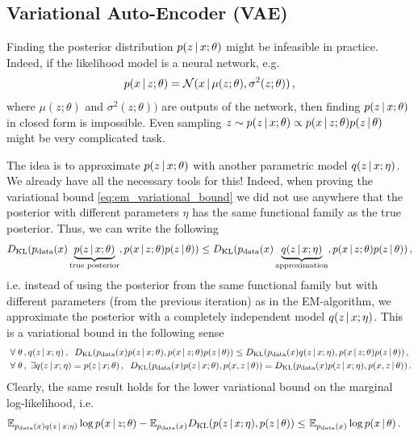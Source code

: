 \subsection{Variational Auto-Encoder (VAE) \citep{kingma2013auto}}

Finding the posterior distribution $p(z\,|\, x;\theta)$ might be infeasible in practice.
Indeed, if the likelihood model is a neural network, e.g.
\begin{align}
    p(x\,|\, z;\theta) = \mathcal{N}(x\,|\, \mu(z;\theta), \sigma^2(z;\theta))\,,
\end{align}
where $\mu(z;\theta)$ and $\sigma^2(z;\theta))$ are outputs of the network, then finding $p(z\,|\, x;\theta)$ in closed form is impossible. 
Even sampling $z \sim p(z\,|\, x;\theta) \propto p(x\,|\, z;\theta)p(z\,|\, \theta)$ might be very complicated task.

The idea is to approximate $p(z\,|\, x;\theta)$ with another parametric model $q(z\,|\, x;\eta)$.
We already have all the necessary tools for this!
Indeed, when proving the variational bound \cref{eq:em_variational_bound} we did not use anywhere that the posterior with different parameters $\eta$ has the same functional family as the true posterior.
Thus, we can write the following
\begin{align}
    D_{\mathrm{KL}}(p_{\text{data}}(x)\underbrace{p(z\,|\, x;\theta)}_{\text{true posterior}}, p(x\,|\, z;\theta)p(z\,|\, \theta)) \leq D_{\mathrm{KL}}(p_{\text{data}}(x)\underbrace{q(z\,|\, x;\eta)}_{\text{approximation}}, p(x\,|\, z;\theta)p(z\,|\, \theta))\,,
\end{align}
i.e. instead of using the posterior from the same functional family but with different parameters (from the previous iteration) as in the EM-algorithm, we approximate the posterior with a completely independent model $q(z\,|\, x;\eta)$.
This is a variational bound in the following sense
\begin{align}
\begin{split}
    ~&\forall\; \theta\,,q(z\,|\, x;\eta)\,,\;\;D_{\mathrm{KL}}(p_{\text{data}}(x)p(z\,|\, x;\theta), p(x\,|\, z;\theta)p(z\,|\, \theta)) \leq D_{\mathrm{KL}}(p_{\text{data}}(x)q(z\,|\, x;\eta), p(x\,|\, z;\theta)p(z\,|\, \theta))\,,\\
    ~&\forall\; \theta\,,\;\exists q(z\,|\, x;\eta) = p(z\,|\, x;\theta) \,,\;\;D_{\mathrm{KL}}(p_{\text{data}}(x)p(z\,|\, x;\theta), p(x,z\,|\, \theta)) = D_{\mathrm{KL}}(p_{\text{data}}(x)p(z\,|\, x;\eta), p(x,z\,|\, \theta))\,.
    \label{eq:vae_variational_bound}
\end{split}
\end{align}
Clearly, the same result holds for the lower variational bound on the marginal log-likelihood, i.e.
\begin{align}
    \mathbb{E}_{p_{\text{data}}(x)q(z\,|\, x;\eta)}\log p(x\,|\, z;\theta) - \mathbb{E}_{p_{\text{data}}(x)}D_{\mathrm{KL}}(p(z\,|\, x;\eta),p(z\,|\,\theta))\leq~& \mathbb{E}_{p_{\text{data}}(x)}\log p(x\,|\, \theta)\,.
\end{align}

